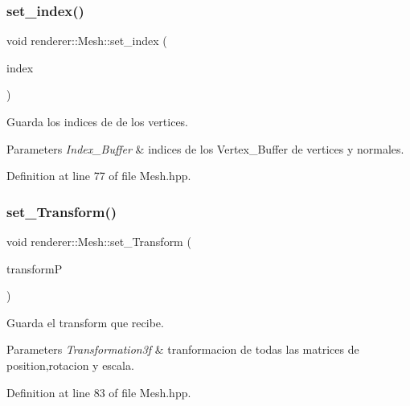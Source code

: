 \subsubsection{\texorpdfstring{set\_index()}{set\_index()}}
{\footnotesize\ttfamily void renderer\+::\+Mesh\+::set\+\_\+index (\begin{DoxyParamCaption}\item[{\mbox{\hyperlink{classrenderer_1_1_mesh_a6a226cb85370a00787fe01f70a0b5ca2}{Index\+\_\+\+Buffer}} \&}]{index }\end{DoxyParamCaption})\hspace{0.3cm}{\ttfamily [inline]}}

Guarda los indices de de los vertices. 
\begin{DoxyParams}{Parameters}
{\em Index\+\_\+\+Buffer} & indices de los Vertex\+\_\+\+Buffer de vertices y normales. \\
\hline
\end{DoxyParams}


Definition at line 77 of file Mesh.\+hpp.

\mbox{\label{classrenderer_1_1_mesh_acaed062c3d1abf115f22f7dba87ed69c}} 
\subsubsection{\texorpdfstring{set\_Transform()}{set\_Transform()}}
{\footnotesize\ttfamily void renderer\+::\+Mesh\+::set\+\_\+\+Transform (\begin{DoxyParamCaption}\item[{Transformation3f \&}]{transformP }\end{DoxyParamCaption})\hspace{0.3cm}{\ttfamily [inline]}}

Guarda el transform que recibe. 
\begin{DoxyParams}{Parameters}
{\em Transformation3f} & tranformacion de todas las matrices de position,rotacion y escala. \\
\hline
\end{DoxyParams}


Definition at line 83 of file Mesh.\+hpp.

\mbox{\label{classrenderer_1_1_mesh_a6d48b23fa3c6fd467e15fdd4f12a6f5a}} 
